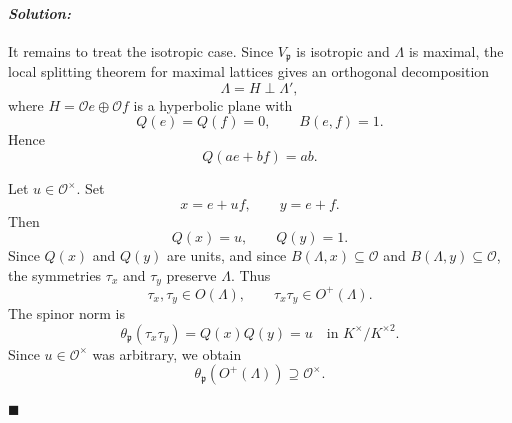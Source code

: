 \documentclass[12pt, a4paper]{article}
\newenvironment{solution}
  {\paragraph{\textit{Solution:}}\par\medskip}
  {\hfill$\blacksquare$\vspace{0.1cm}}
\begin{document}
\begin{solution}
\begin{enumerate}
    It remains to treat the isotropic case. Since \(V_{\mathfrak p}\) is
    isotropic and \(\Lambda\) is maximal, the local splitting theorem for
    maximal lattices gives an orthogonal decomposition
    \[
    \Lambda=H\perp \Lambda',
    \]
    where \(H=\mathcal Oe\oplus \mathcal Of\) is a hyperbolic plane with
    \[
    Q(e)=Q(f)=0,
    \qquad
    B(e,f)=1.
    \]
    Hence
    \[
    Q(ae+bf)=ab.
    \]

    Let \(u\in\mathcal O^\times\). Set
    \[
    x=e+uf,
    \qquad
    y=e+f.
    \]
    Then
    \[
    Q(x)=u,
    \qquad
    Q(y)=1.
    \]
    Since \(Q(x)\) and \(Q(y)\) are units, and since \(B(\Lambda,x)\subseteq
    \mathcal O\) and \(B(\Lambda,y)\subseteq\mathcal O\), the symmetries
    \(\tau_x\) and \(\tau_y\) preserve \(\Lambda\). Thus
    \[
    \tau_x,\tau_y\in O(\Lambda),
    \qquad
    \tau_x\tau_y\in O^+(\Lambda).
    \]
    The spinor norm is
    \[
    \theta_{\mathfrak p}(\tau_x\tau_y)
    =
    Q(x)Q(y)
    =
    u
    \quad \text{in } K^\times/K^{\times 2}.
    \]
    Since \(u\in\mathcal O^\times\) was arbitrary, we obtain
    \[
    \theta_{\mathfrak p}(O^+(\Lambda))
    \supseteq \mathcal O^\times.
    \]
\end{enumerate}
\end{solution}
\end{document}
